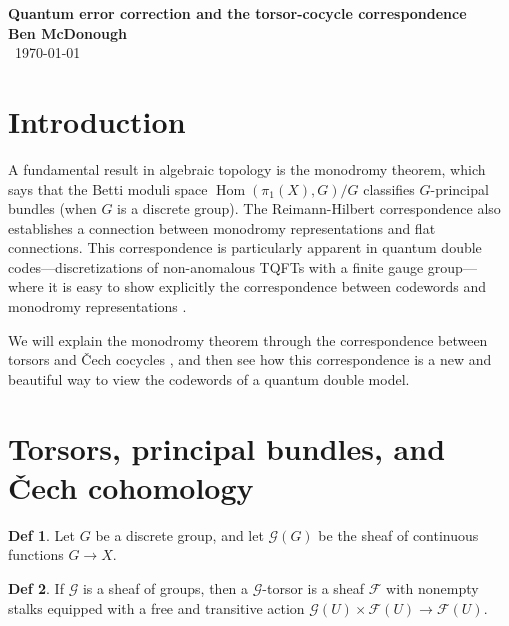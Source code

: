 \documentclass[11pt]{article}
\theoremstyle{definition}
\newtheorem{defn}{Def}
\newcommand{\Hom}{\operatorname{Hom}}
\begin{document}
\noindent\Large{\textbf{Quantum error correction and the torsor-cocycle correspondence}} \\
\normalsize{\textbf{Ben McDonough}}\\\
\normalsize{\today}

\tableofcontents

\section{Introduction}
A fundamental result in algebraic topology is the monodromy theorem, which says
that the Betti moduli space $\Hom(\pi_1(X), G)/G$ classifies $G$-principal
bundles (when $G$ is a discrete group). The
Reimann-Hilbert correspondence also establishes a connection between monodromy
representations and flat connections. This correspondence is particularly
apparent in quantum double codes---discretizations of non-anomalous TQFTs with a
finite gauge group---where it is easy to show explicitly the
correspondence between codewords and monodromy representations \cite{mcdonough, cui}.

We will explain the monodromy theorem through the correspondence between torsors
and \v{C}ech cocycles \cite{gallego}, and then see how this correspondence is a new and beautiful way to view
the codewords of a quantum double model.

\section{Torsors, principal bundles, and \v{C}ech cohomology}
\begin{defn}
Let $G$ be a discrete group, and let $\mathcal G(G)$ be the sheaf of continuous 
functions $G \to X$.
\end{defn}

\begin{defn}
 If $\mathcal G$ is a sheaf of groups, then a $\mathcal G$-torsor is a sheaf
 $\mathcal F$ with nonempty stalks equipped with a free and transitive action
 $\mathcal G(U) \times \mathcal F(U) \to \mathcal F(U)$.
\end{defn}
\end{document}
